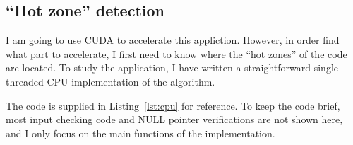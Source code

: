 \documentclass[11pt,a4paper]{article}
\begin{document}
        \subsection{``Hot zone'' detection}
            I am going to use CUDA to accelerate this appliction.
            However, in order find what part to accelerate, I first need to know where the ``hot zones'' of the code are located.
            To study the application, I have written a straightforward single-threaded CPU implementation of the algorithm.

            The code is supplied in Listing~\ref{lst:cpu} for reference.
            To keep the code brief, most input checking code and NULL pointer verifications are not shown here, and I only focus on the main functions of the implementation.
            \newpage

            
\end{document}
